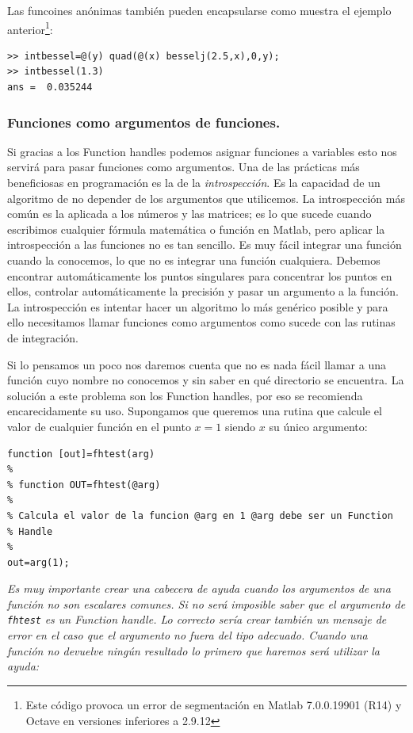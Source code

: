 Las funcoines anónimas también pueden encapsularse como muestra el
ejemplo anterior\footnote{Este código provoca un error de segmentación
en Matlab 7.0.0.19901 (R14) y Octave en versiones inferiores a
2.9.12}:

\begin{lstlisting}
>> intbessel=@(y) quad(@(x) besselj(2.5,x),0,y);
>> intbessel(1.3)
ans =  0.035244
\end{lstlisting}


\subsubsection{Funciones como argumentos de funciones.}

Si gracias a los Function handles podemos asignar funciones a
variables esto nos servirá para pasar funciones como argumentos. Una
de las prácticas más beneficiosas en programación es la de la
\emph{introspección}.  Es la capacidad de un
algoritmo de no depender de los argumentos que utilicemos. La
introspección más común es la aplicada a los números y las matrices;
es lo que sucede cuando escribimos cualquier fórmula matemática o
función en Matlab, pero aplicar la introspección a las funciones no es
tan sencillo. Es muy fácil integrar una función cuando la conocemos,
lo que no es integrar una función cualquiera. Debemos encontrar
automáticamente los puntos singulares para concentrar los puntos en
ellos, controlar automáticamente la precisión y pasar un argumento a
la función. La introspección es intentar hacer un algoritmo lo más
genérico posible y para ello necesitamos llamar funciones como
argumentos como sucede con las rutinas de integración.

Si lo pensamos un poco nos daremos cuenta que no es nada fácil llamar
a una función cuyo nombre no conocemos y sin saber en qué directorio
se encuentra. La solución a este problema son los Function handles,
por eso se recomienda encarecidamente su uso. Supongamos que queremos
una rutina que calcule el valor de cualquier función en el punto $x=1$
siendo $x$ su único argumento:

\begin{lstlisting}
function [out]=fhtest(arg)
%
% function OUT=fhtest(@arg)
%
% Calcula el valor de la funcion @arg en 1 @arg debe ser un Function
% Handle
%
out=arg(1);
\end{lstlisting}
\emph{Es muy importante crear una cabecera de ayuda cuando los
  argumentos de una función no son escalares comunes. Si no será
  imposible saber que el argumento de} \texttt{\emph{fhtest}} \emph{es
  un Function handle.  Lo correcto sería crear también un mensaje de
  error en el caso que el argumento no fuera del tipo adecuado. Cuando
  una función no devuelve ningún resultado lo primero que haremos será
  utilizar la ayuda:}

